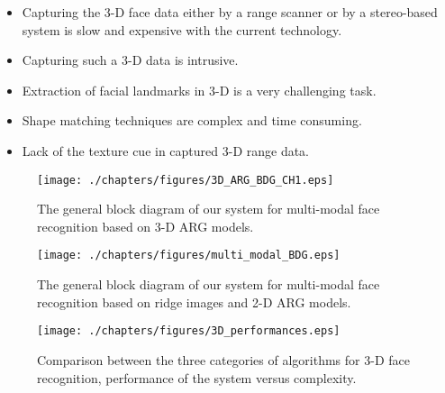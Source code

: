 \begin{itemize}
\item Capturing the 3-D face data either by a range scanner or by a stereo-based system is slow and expensive
with the current technology.
\item Capturing such a 3-D data is intrusive.
\item Extraction of facial landmarks in 3-D is a very challenging task.
\item Shape matching techniques are complex and time consuming.
\item Lack of the texture cue in captured 3-D range data.
\end{itemize}


\begin{figure}
\begin{center}
\texttt{[image: ./chapters/figures/3D\_ARG\_BDG\_CH1.eps]}\\
\caption{The general block diagram of our system for multi-modal
face recognition based on 3-D ARG
models.}\label{fig_3D_ARG_modeling}
\end{center}
\end{figure}

\begin{figure}
\begin{center}
\texttt{[image: ./chapters/figures/multi\_modal\_BDG.eps]}\\
\caption{The general block diagram of our system for multi-modal
face recognition based on ridge images and 2-D ARG
models.}\label{fig_gbd_ridge_ARG}
\end{center}
\end{figure}

\begin{figure}
\begin{center}
\texttt{[image: ./chapters/figures/3D\_performances.eps]}\\
\caption{Comparison between the three categories of algorithms for
3-D face recognition, performance of the system versus
complexity.}\label{fig_3-D_comparison}
\end{center}
\end{figure}

